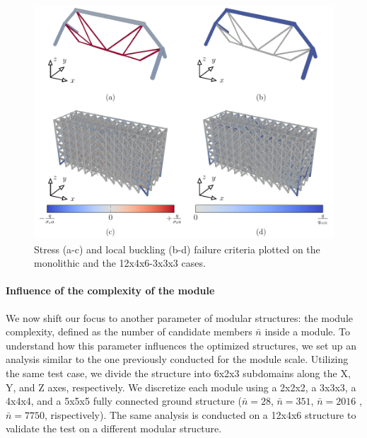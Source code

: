     \begin{figure}
        \centering
        \includegraphics[width=\linewidth]{figures/05_cellular_opt/00_module_scale_failure/12x4x6_mech.pdf}
        \caption{Stress (a-c) and local buckling (b-d) failure criteria plotted on the monolithic and the 12x4x6-3x3x3 cases.}
        \label{fig:05_scale_failure}
    \end{figure}

\paragraph{Influence of the complexity of the module}
We now shift our focus to another parameter of modular structures: the module complexity, defined as the number of candidate members $\bar{n}$ inside a module. To understand how this parameter influences the optimized structures, we set up an analysis similar to the one previously conducted for the module scale. Utilizing the same test case, we divide the structure into 6x2x3 subdomains along the X, Y, and Z axes, respectively. We discretize each module using a 2x2x2, a 3x3x3, a 4x4x4, and a 5x5x5 fully connected ground structure ($\bar{n}=28$, $\bar{n}=351$, $\bar{n}=2016$ , $\bar{n}=7750$, rispectively). The same analysis is conducted on a 12x4x6 structure to validate the test on a different modular structure.

